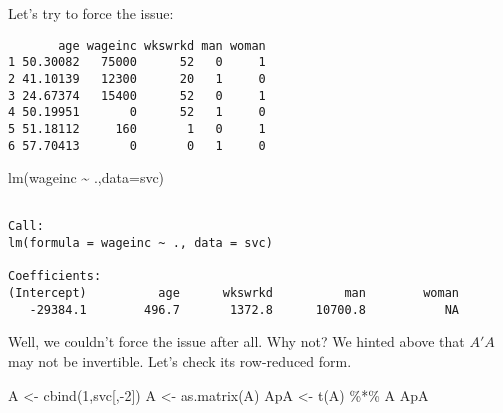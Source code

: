 \documentclass[
  letterpaper,
  DIV=11,
  numbers=noendperiod,
  oneside]{scrreprt}
\newenvironment{Shaded}{\begin{snugshade}}{\end{snugshade}}
\newcommand{\AttributeTok}[1]{\textcolor[rgb]{0.40,0.45,0.13}{#1}}
\newcommand{\ConstantTok}[1]{\textcolor[rgb]{0.56,0.35,0.01}{#1}}
\newcommand{\DecValTok}[1]{\textcolor[rgb]{0.68,0.00,0.00}{#1}}
\newcommand{\FunctionTok}[1]{\textcolor[rgb]{0.28,0.35,0.67}{#1}}
\newcommand{\NormalTok}[1]{\textcolor[rgb]{0.00,0.23,0.31}{#1}}
\newcommand{\OtherTok}[1]{\textcolor[rgb]{0.00,0.23,0.31}{#1}}
\newcommand{\SpecialCharTok}[1]{\textcolor[rgb]{0.37,0.37,0.37}{#1}}
\newcommand{\StringTok}[1]{\textcolor[rgb]{0.13,0.47,0.30}{#1}}
\begin{document}
Let's try to force the issue:

\begin{Shaded}
\end{Shaded}

\begin{verbatim}
       age wageinc wkswrkd man woman
1 50.30082   75000      52   0     1
2 41.10139   12300      20   1     0
3 24.67374   15400      52   0     1
4 50.19951       0      52   1     0
5 51.18112     160       1   0     1
6 57.70413       0       0   1     0
\end{verbatim}

\begin{Shaded}
\begin{Highlighting}[]
\FunctionTok{lm}\NormalTok{(wageinc }\SpecialCharTok{\textasciitilde{}}\NormalTok{ .,}\AttributeTok{data=}\NormalTok{svc)}
\end{Highlighting}
\end{Shaded}

\begin{verbatim}

Call:
lm(formula = wageinc ~ ., data = svc)

Coefficients:
(Intercept)          age      wkswrkd          man        woman  
   -29384.1        496.7       1372.8      10700.8           NA  
\end{verbatim}

Well, we couldn't force the issue after all. Why not? We hinted above
that \(A' A\) may not be invertible. Let's check its row-reduced form.

\begin{Shaded}
\begin{Highlighting}[]
\NormalTok{A }\OtherTok{\textless{}{-}} \FunctionTok{cbind}\NormalTok{(}\DecValTok{1}\NormalTok{,svc[,}\SpecialCharTok{{-}}\DecValTok{2}\NormalTok{])}
\NormalTok{A }\OtherTok{\textless{}{-}} \FunctionTok{as.matrix}\NormalTok{(A)}
\NormalTok{ApA }\OtherTok{\textless{}{-}} \FunctionTok{t}\NormalTok{(A) }\SpecialCharTok{\%*\%}\NormalTok{ A}
\NormalTok{ApA}
\end{Highlighting}
\end{Shaded}
\end{document}
